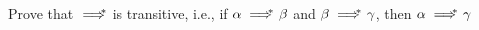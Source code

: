 Prove that $\implies^{\hspace{-0.3cm}*}$ is transitive, i.e., if 
$\alpha \implies^{\hspace{-0.3cm}*}\ \beta$
and 
$\beta \implies^{\hspace{-0.3cm}*}\ \gamma$, then
$\alpha \implies^{\hspace{-0.3cm}*}\ \gamma$
